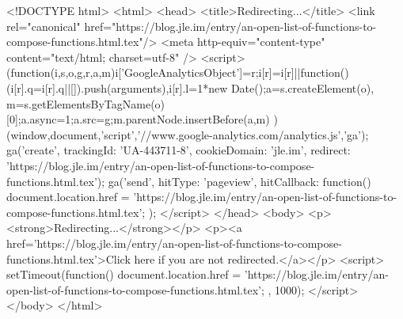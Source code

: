 <!DOCTYPE html>
<html>
<head>
<title>Redirecting...</title>
<link rel="canonical" href="https://blog.jle.im/entry/an-open-list-of-functions-to-compose-functions.html.tex"/>
<meta http-equiv="content-type" content="text/html; charset=utf-8" />
<script>
(function(i,s,o,g,r,a,m){i['GoogleAnalyticsObject']=r;i[r]=i[r]||function(){
(i[r].q=i[r].q||[]).push(arguments)},i[r].l=1*new Date();a=s.createElement(o),
m=s.getElementsByTagName(o)[0];a.async=1;a.src=g;m.parentNode.insertBefore(a,m)
})(window,document,'script','//www.google-analytics.com/analytics.js','ga');
ga('create', { trackingId: 'UA-443711-8', cookieDomain: 'jle.im', redirect: 'https://blog.jle.im/entry/an-open-list-of-functions-to-compose-functions.html.tex'});
ga('send', { hitType: 'pageview', hitCallback: function() { document.location.href = 'https://blog.jle.im/entry/an-open-list-of-functions-to-compose-functions.html.tex'; } });
</script>
</head>
<body>
  <p><strong>Redirecting...</strong></p>
  <p><a href='https://blog.jle.im/entry/an-open-list-of-functions-to-compose-functions.html.tex'>Click here if you are not redirected.</a></p>
  <script>
    setTimeout(function() { document.location.href = 'https://blog.jle.im/entry/an-open-list-of-functions-to-compose-functions.html.tex'; }, 1000);
  </script>
</body>
</html>
